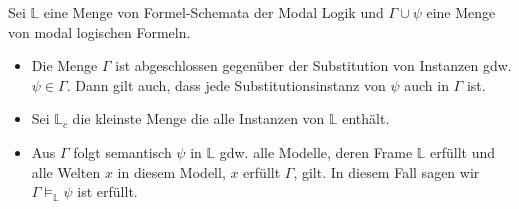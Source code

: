 \begin{definition}
	\label{def:substitution}
	Sei $\mathds{L}$ eine Menge von Formel-Schemata der Modal Logik und $\Gamma \cup {\psi}$ eine Menge von modal logischen Formeln.
	
	\begin{itemize}
		\item Die Menge $\Gamma$ ist abgeschlossen gegenüber der Substitution von Instanzen gdw.  $\psi \in \Gamma$. 
		Dann gilt auch, dass jede Substitutionsinstanz von $\psi$ auch in $\Gamma$ ist.
		\item Sei $\mathds{L}_c$ die kleinste Menge die alle Instanzen von $\mathds{L}$ enthält.
		\item Aus $\Gamma$ folgt semantisch $\psi$ in $\mathds{L}$ gdw. alle Modelle, deren Frame $\mathds{L}$ erfüllt und alle Welten $x$ in diesem Modell, $x$ erfüllt $\Gamma$, gilt.
		In diesem Fall sagen wir $\Gamma \vDash_{\mathds{L}} \psi$ ist erfüllt.
	\end{itemize}
	\cite[S.326]{huth2004logic}
\end{definition}

